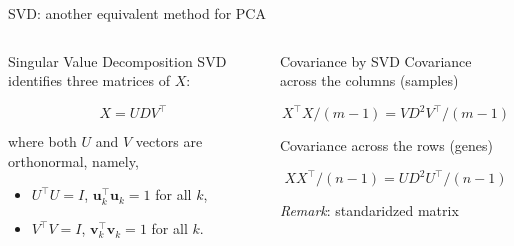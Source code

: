 \documentclass[
  ignorenonframetext,
  aspectratio=169]{beamer}
\begin{document}
\begin{frame}{SVD: another equivalent method for PCA}
\protect\hypertarget{svd-another-equivalent-method-for-pca}{}
\begin{columns}[T]
\begin{column}{.45\textwidth}
\begin{block}{Singular Value Decomposition}
\protect\hypertarget{singular-value-decomposition}{}
SVD identifies three matrices of \(X\):

\[X = U D V^{\top}\]

where both \(U\) and \(V\) vectors are orthonormal, namely,

\begin{itemize}
\item
  \(U^{\top}U = I\), \(\mathbf{u}_{k}^{\top}\mathbf{u}_{k}=1\) for all
  \(k\),
\item
  \(V^{\top}V = I\), \(\mathbf{v}_{k}^{\top}\mathbf{v}_{k} = 1\) for all
  \(k\).
\end{itemize}
\end{block}
\end{column}

\begin{column}{.45\textwidth}
\begin{block}{Covariance by SVD}
\protect\hypertarget{covariance-by-svd}{}
Covariance across the columns (samples)

\[X^{\top}X/(m-1) = V D^{2} V^{\top}/(m-1)\]

Covariance across the rows (genes)

\[XX^{\top}/(n-1) = U D^{2} U^{\top}/(n-1)\]
\end{block}

\emph{Remark}: standaridzed matrix
\end{column}
\end{columns}
\end{frame}
\end{document}
